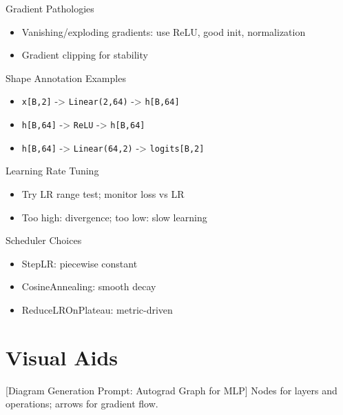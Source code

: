 \documentclass[aspectratio=169,10pt]{beamer}
\begin{document}
\begin{frame}{Gradient Pathologies}
\begin{itemize}
    \item Vanishing/exploding gradients: use ReLU, good init, normalization
    \item Gradient clipping for stability
\end{itemize}
\end{frame}

\begin{frame}{Shape Annotation Examples}
\begin{itemize}
    \item \texttt{x[B,2]} -> \texttt{Linear(2,64)} -> \texttt{h[B,64]}
    \item \texttt{h[B,64]} -> \texttt{ReLU} -> \texttt{h[B,64]}
    \item \texttt{h[B,64]} -> \texttt{Linear(64,2)} -> \texttt{logits[B,2]}
\end{itemize}
\end{frame}

\begin{frame}{Learning Rate Tuning}
\begin{itemize}
    \item Try LR range test; monitor loss vs LR
    \item Too high: divergence; too low: slow learning
\end{itemize}
\end{frame}

\begin{frame}{Scheduler Choices}
\begin{itemize}
    \item StepLR: piecewise constant
    \item CosineAnnealing: smooth decay
    \item ReduceLROnPlateau: metric-driven
\end{itemize}
\end{frame}

\section{Visual Aids}

\begin{frame}{[Diagram Generation Prompt: Autograd Graph for MLP]}
Nodes for layers and operations; arrows for gradient flow.
\end{frame}
\end{document}
